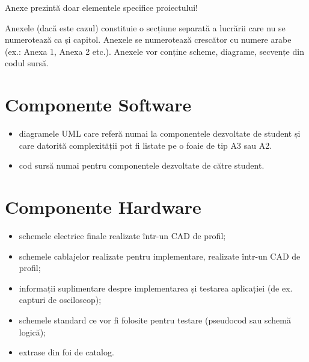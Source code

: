\iffalse
{}

Anexe prezintă doar elementele specifice proiectului!

Anexele (dacă este cazul) constituie o secțiune separată a lucrării care nu se numerotează ca și capitol. Anexele se numerotează crescător cu numere arabe (ex.: Anexa 1, Anexa 2 etc.). Anexele vor conține scheme, diagrame, secvențe din codul sursă.

\section{Componente Software}
\label{anexa1:comp_soft}

\begin{itemize}
    \item diagramele UML care referă numai la componentele dezvoltate de student și care datorită complexității pot fi listate pe o foaie de tip A3 sau A2.
    \item cod sursă numai pentru componentele dezvoltate de către student.
\end{itemize}

\newpage
\section{Componente Hardware}
\label{anexa2:comp_hard}

\begin{itemize}
    \item schemele electrice finale realizate într-un CAD de profil; 
    \item schemele cablajelor realizate pentru implementare, realizate într-un CAD de profil;
    \item informații suplimentare despre implementarea și testarea aplicației (de ex. capturi de osciloscop);
    \item schemele standard ce vor fi folosite pentru testare (pseudocod sau schemă logică);
    \item extrase din foi de catalog. 
\end{itemize}

